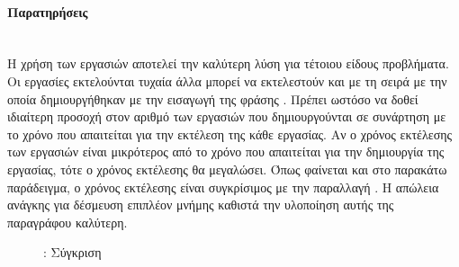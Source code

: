 \paragraph{Παρατηρήσεις}
\ \\
Η χρήση των εργασιών αποτελεί την καλύτερη λύση για τέτοιου είδους προβλήματα. Οι εργασίες εκτελούνται τυχαία άλλα μπορεί να εκτελεστούν και με τη σειρά με την οποία δημιουργήθηκαν με την εισαγωγή της φράσης . Πρέπει ωστόσο να δοθεί ιδιαίτερη προσοχή στον αριθμό των εργασιών που δημιουργούνται σε συνάρτηση με το χρόνο που απαιτείται για την εκτέλεση της κάθε εργασίας. Αν ο χρόνος εκτέλεσης των εργασιών είναι μικρότερος από το χρόνο που απαιτείται για την δημιουργία της εργασίας, τότε ο χρόνος εκτέλεσης θα μεγαλώσει. Όπως φαίνεται και στο παρακάτω παράδειγμα, ο χρόνος εκτέλεσης είναι συγκρίσιμος με την παραλλαγή . Η απώλεια ανάγκης για δέσμευση επιπλέον μνήμης καθιστά την υλοποίηση αυτής της παραγράφου καλύτερη.
\begin{figure}[h]
\centering 
\resizebox{0.5\textwidth}{!} {
}%
 \caption{: Σύγκριση }
\end{figure}

